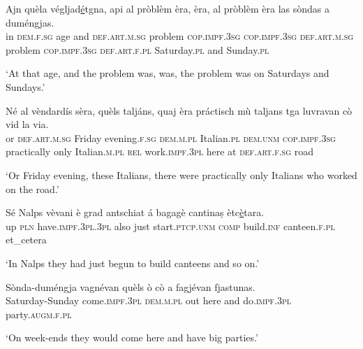 \begin{linenumbers}
\gll  Ajn quèla végljad\underline{é}tgna, api al pròblèm èra, èra, al pròblèm èra las sòndas a duméngjas.   \\
in  \textsc{dem.f.sg} age and \textsc{def.art.m.sg} problem \textsc{cop.impf.3sg} \textsc{cop.impf.3sg} \textsc{def.art.m.sg} problem \textsc{cop.impf.3sg} \textsc{def.art.f.pl} Saturday.\textsc{pl} and Sunday.\textsc{pl} \\
\end{linenumbers}
\medskip
\glt `At that age, and the problem was, was, the problem was on Saturdays and Sundays.'
\medskip

\begin{linenumbers}
\gll Né al vèndardís sèra, quèls taljáns, quaj èra práctisch mù taljans tga luvravan cò vid la via. \\
or \textsc{def.art.m.sg} Friday evening.\textsc{f.sg} \textsc{dem.m.pl} Italian.\textsc{pl} \textsc{dem.unm} \textsc{cop.impf.3sg}  practically only Italian.\textsc{m.pl} \textsc{rel} work.\textsc{impf.3pl} here at \textsc{def.art.f.sg} road  \\
\end{linenumbers}
\medskip
\glt `Or Friday evening, these Italians, there were practically only Italians who worked on the road.'
\medskip

\begin{linenumbers}
\gll  Sé Nalps vèvani è grad antschiat á bagagè cantinaṣ ètc\underline{è}tara.\\
up \textsc{pln} have.\textsc{impf.3pl.3pl} also just start.\textsc{ptcp.unm} \textsc{comp} build.\textsc{inf} canteen.\textsc{f.pl} et\_cetera\\
\end{linenumbers}
\medskip
\glt `In Nalps they had just begun to build canteens and so on.'
\medskip

\begin{linenumbers}
\gll Sònda-duméngja vagnévan quèls ò cò a fagjévan fjastunas.\\
Saturday-Sunday come.\textsc{impf.3pl} \textsc{dem.m.pl} out here and do.\textsc{impf.3pl} party.\textsc{augm.f.pl}\\
\end{linenumbers}
\medskip
\glt `On week-ends they would come here and have big parties.'
\medskip

